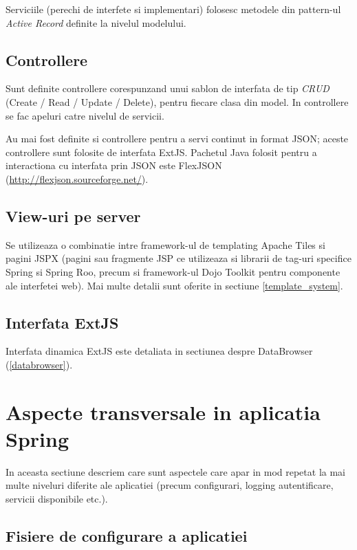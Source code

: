Serviciile (perechi de interfete si implementari) folosesc 
metodele din pattern-ul \emph{Active Record} definite la nivelul modelului.

\subsection{Controllere}
Sunt definite controllere corespunzand unui sablon de interfata de tip \emph{CRUD}
(Create / Read / Update / Delete), pentru fiecare clasa din model. 
In controllere se fac apeluri catre nivelul de servicii.

Au mai fost definite si controllere pentru a servi continut in format JSON;
aceste controllere sunt folosite de interfata ExtJS. 
Pachetul Java folosit pentru a interactiona cu interfata prin JSON este FlexJSON (\url{http://flexjson.sourceforge.net/}).

\subsection{View-uri pe server}
Se utilizeaza o combinatie intre framework-ul de templating Apache Tiles si pagini JSPX 
(pagini sau fragmente JSP ce utilizeaza si librarii de tag-uri specifice Spring si Spring Roo, 
precum si framework-ul Dojo Toolkit pentru componente ale interfetei web). 
Mai multe detalii sunt oferite in sectiune \ref{template_system}.

\subsection{Interfata ExtJS}
Interfata dinamica ExtJS este detaliata in sectiunea despre DataBrowser (\ref{databrowser}). 

\section{Aspecte transversale in aplicatia Spring}
In aceasta sectiune descriem care sunt aspectele care apar in mod repetat la mai
multe niveluri diferite ale aplicatiei (precum configurari, logging
autentificare, servicii disponibile etc.).

\subsection{Fisiere de configurare a aplicatiei}
\label{fisiere_configurare}

